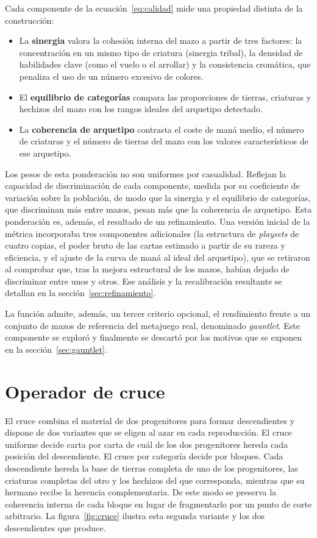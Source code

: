 Cada componente de la ecuación~\ref{eq:calidad} mide una propiedad distinta de la construcción:

\begin{itemize}
    \item La \textbf{sinergia} valora la cohesión interna del mazo a partir de tres factores: la concentración en un mismo tipo de criatura (sinergia tribal), la densidad de habilidades clave (como el vuelo o el arrollar) y la consistencia cromática, que penaliza el uso de un número excesivo de colores.
    \item El \textbf{equilibrio de categorías} compara las proporciones de tierras, criaturas y hechizos del mazo con los rangos ideales del arquetipo detectado.
    \item La \textbf{coherencia de arquetipo} contrasta el coste de maná medio, el número de criaturas y el número de tierras del mazo con los valores característicos de ese arquetipo.
\end{itemize}

Los pesos de esta ponderación no son uniformes por casualidad. Reflejan la capacidad de discriminación de cada componente, medida por su coeficiente de variación sobre la población, de modo que la sinergia y el equilibrio de categorías, que discriminan más entre mazos, pesan más que la coherencia de arquetipo. Esta ponderación es, además, el resultado de un refinamiento. Una versión inicial de la métrica incorporaba tres componentes adicionales (la estructura de \emph{playsets} de cuatro copias, el poder bruto de las cartas estimado a partir de su rareza y eficiencia, y el ajuste de la curva de maná al ideal del arquetipo), que se retiraron al comprobar que, tras la mejora estructural de los mazos, habían dejado de discriminar entre unos y otros. Ese análisis y la recalibración resultante se detallan en la sección~\ref{sec:refinamiento}.

La función admite, además, un tercer criterio opcional, el rendimiento frente a un conjunto de mazos de referencia del metajuego real, denominado \emph{gauntlet}. Este componente se exploró y finalmente se descartó por los motivos que se exponen en la sección~\ref{sec:gauntlet}.

\section{Operador de cruce}
\label{sec:cruce}

El cruce combina el material de dos progenitores para formar descendientes y dispone de dos variantes que se eligen al azar en cada reproducción. El cruce uniforme decide carta por carta de cuál de los dos progenitores hereda cada posición del descendiente. El cruce por categoría decide por bloques. Cada descendiente hereda la base de tierras completa de uno de los progenitores, las criaturas completas del otro y los hechizos del que corresponda, mientras que su hermano recibe la herencia complementaria. De este modo se preserva la coherencia interna de cada bloque en lugar de fragmentarlo por un punto de corte arbitrario. La figura~\ref{fig:cruce} ilustra esta segunda variante y los dos descendientes que produce.

